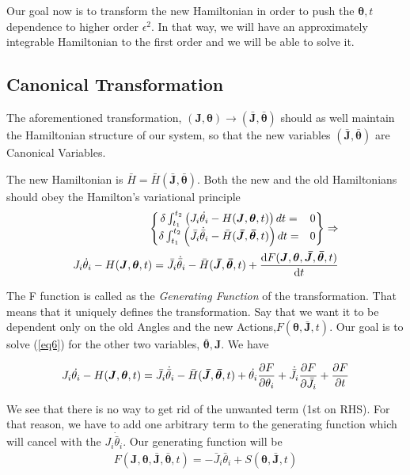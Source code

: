 	Our goal now is to transform the new Hamiltonian in order to push the $\bm{\theta},t$ dependence to higher order $\epsilon ^2$. In that way, we will have an approximately integrable Hamiltonian to the first order and we will be able to solve it. 
	
	\subsection*{Canonical Transformation}
	
	The aforementioned transformation, $(\bm{J},\bm{\theta})\rightarrow(\bm{\bar{J}},\bm{\bar{\theta}})$ should as well maintain the Hamiltonian structure of our system, so that the new variables $(\bm{\bar{J}},\bm{\bar{\theta}})$ are Canonical Variables.
	
	The new Hamiltonian is $\bar{H} = \bar{H}(\bm{\bar{J}},\bm{\bar{\theta}})$. Both the new and the old Hamiltonians should obey the Hamilton's variational principle 
	\begin{align}\label{eq6}
		\left\{
		\begin{matrix}
				\delta\int_{t_1}^{t_2}\left( J_i \dot{\theta_i} - H(\bm{J},\bm{\theta},t)\right)dt =& 0\\
				 \delta\int_{t_1}^{t_2}\left( \bar{J}_i \dot{\bar{\theta}}_i - \bar{H}(\bm{\bar{J}},\bm{\bar{\theta}},t)\right)dt =& 0
		\end{matrix}  \right\}\Rightarrow \nonumber \\
		J_i \dot{\theta}_i - H(\bm{J},\bm{\theta},t) =\bar{J}_i \dot{\bar{\theta}}_i - \bar{H}(\bm{\bar{J}},\bm{\bar{\theta}},t) + \odv{F(\bm{J},\bm{\theta},\bm{\bar{J}},\bm{\bar{\theta}},t)}{t} 
	\end{align}
	
	The F function is called as the \textit{Generating Function} of the transformation. That means that it uniquely defines the transformation. Say that we want it to be dependent only on the old Angles and the new Actions,$F(\bm{\theta},\bm{\bar{J}},t)$. Our goal is to solve (\ref{eq6}) for the other two variables, $\bm{\bar{\theta}},\bm{J}$. We have  
	
		\begin{align*}
			J_i\dot{\theta_i}- H(\bm{J},\bm{\theta},t) =\bar{J}_i \dot{\bar{\theta}}_i - \bar{H}(\bm{\bar{J}},\bm{\bar{\theta}},t) + \dot{\theta_i}\pdv{F}{\theta_i} + \dot{\bar{J}}_i\pdv{F}{\bar{J}_i} + \pdv{F}{t}
		\end{align*}
	
	We see that there is no way to get rid of the unwanted term (1st on RHS). For that reason, we have to add one arbitrary term to the generating function which will cancel with the $J_i\dot{\bar{\theta}}_i$. Our generating function will be 
		\begin{align}
			F(\bm{J},\bm{\theta},\bm{\bar{J}},\bm{\bar{\theta}},t) = -\bar{J}_i\bar{\theta}_i + S(\bm{\theta},\bm{\bar{J}},t)
		\end{align}
	
